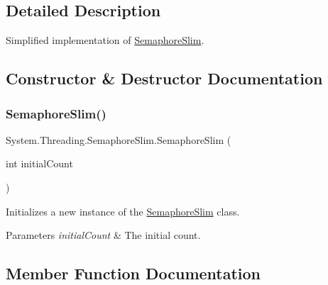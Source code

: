 \subsection{Detailed Description}
Simplified implementation of \hyperlink{class_system_1_1_threading_1_1_semaphore_slim}{Semaphore\+Slim}. 



\subsection{Constructor \& Destructor Documentation}
\mbox{\label{class_system_1_1_threading_1_1_semaphore_slim_a159791eab1acdede5135bfd5befdd6b7}} 
\subsubsection{\texorpdfstring{Semaphore\+Slim()}{SemaphoreSlim()}}
{\footnotesize\ttfamily System.\+Threading.\+Semaphore\+Slim.\+Semaphore\+Slim (\begin{DoxyParamCaption}\item[{int}]{initial\+Count }\end{DoxyParamCaption})\hspace{0.3cm}{\ttfamily [inline]}}



Initializes a new instance of the \hyperlink{class_system_1_1_threading_1_1_semaphore_slim}{Semaphore\+Slim} class. 


\begin{DoxyParams}{Parameters}
{\em initial\+Count} & The initial count.\\
\hline
\end{DoxyParams}


\subsection{Member Function Documentation}
\mbox{\label{class_system_1_1_threading_1_1_semaphore_slim_a4ae552cd56b642eeb53c4cfa864663a3}} 
